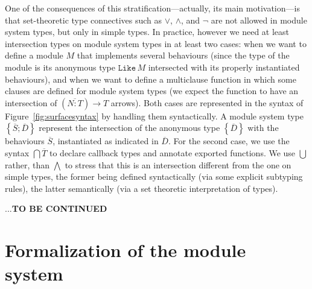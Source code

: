\documentclass[a4paper,10pt]{article}
\begin{document}
  One of the consequences of this stratification---actually, its main motivation---is that set-theoretic type connectives such as $\vee$, $\wedge$, and $\neg$ are not allowed in module system types, but only in simple types. In practice, however we need at least intersection types on module system types in at least two cases: when we want to define a module $M$ that implements several behaviours (since the type of the module is its anonymous type $\texttt{Like}\,M$ intersected with its properly instantiated behaviours), and when we want to define a multiclause function in which some clauses are defined for module system types (we expect the function to have an intersection of $(\overline{N:T})\to T$ arrows). Both cases are represented in the syntax of Figure~\ref{fig:surfacesyntax} by handling them syntactically. A module system type $\left\{\overline{S};\overline{D}\right\}$ represent the intersection of the anonymous type $\left\{\overline{D}\right\}$ with the behaviours $\overline{S}$, instantiated as indicated in $\overline{D}$. For the second case, we use the syntax $\bigcap \overline{T}$ to declare callback types and annotate exported functions. We use $\bigcup$ rather, than $\bigwedge$ to stress that this is an intersection different from the one on simple types, the former being defined syntactically (via some explicit subtyping rules), the latter semantically (via a set theoretic interpretation of types).
  
  ...\textbf{TO BE CONTINUED} 




\section{Formalization of the module system}
\end{document}
